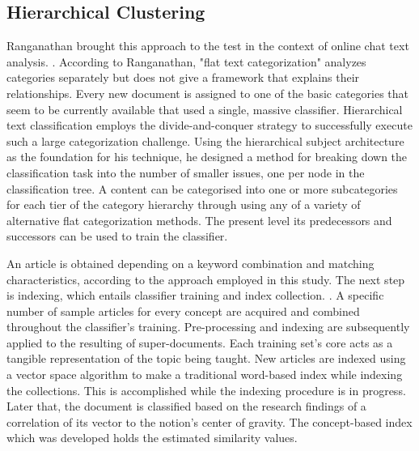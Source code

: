 \documentclass[a4paper]{article}
\begin{document}
\subsection{Hierarchical Clustering}
Ranganathan brought this approach to the test in the context of online chat text analysis. \cite{ES10}. According to Ranganathan, "flat text categorization" analyzes categories separately but does not give a framework that explains their relationships. Every new document is assigned to one of the basic categories that seem to be currently available that used a single, massive classifier. Hierarchical text classification employs the divide-and-conquer strategy to successfully execute such a large categorization challenge. Using the hierarchical subject architecture as the foundation for his technique, he designed a method for breaking down the classification task into the number of smaller issues, one per node in the classification tree. A content can be categorised into one or more subcategories for each tier of the category hierarchy through using any of a variety of alternative flat categorization methods. The present level its predecessors and successors can be used to train the classifier.

An article is obtained depending on a keyword combination and matching characteristics, according to the approach employed in this study. The next step is indexing, which entails classifier training and index collection. \cite{ES10}. A specific number of sample articles for every concept are acquired and combined throughout the classifier's training. Pre-processing and indexing are subsequently applied to the resulting of super-documents. Each training set's core acts as a tangible representation of the topic being taught. New articles are indexed using a vector space algorithm to make a traditional word-based index while indexing the collections. This is accomplished while the indexing procedure is in progress. Later that, the document is classified based on the research findings of a correlation of its vector to the notion's center of gravity. The concept-based index which was developed holds the estimated similarity values.
\end{document}
